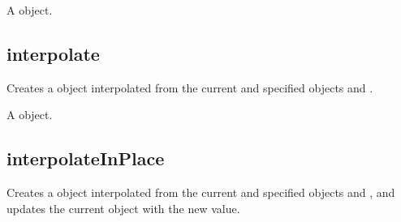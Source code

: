 \documentclass[letterpaper,12pt,english,openany,oneside]{sphinxmanual}
\begin{document}
\label{\detokenize{JS_3D_API:section-78}}\label{\detokenize{JS_3D_API:returns-75}}

A  object.


\subsection{interpolate}
\label{\detokenize{JS_3D_API:interpolate}}
Creates a  object interpolated from the current and specified  objects and .

\label{\detokenize{JS_3D_API:syntax-75}}

\begin{sphinxVerbatim}[commandchars=\\\{\}]
 
\end{sphinxVerbatim}
\label{\detokenize{JS_3D_API:parameters-55}}

\label{\detokenize{JS_3D_API:section-79}}\label{\detokenize{JS_3D_API:returns-76}}

A  object.


\subsection{interpolateInPlace}
\label{\detokenize{JS_3D_API:interpolateinplace}}
Creates a  object interpolated from the current and specified  objects and  , and updates the current  object with the new value.

\label{\detokenize{JS_3D_API:syntax-76}}

\begin{sphinxVerbatim}[commandchars=\\\{\}]
 
\end{sphinxVerbatim}
\label{\detokenize{JS_3D_API:parameters-56}}
\end{document}
